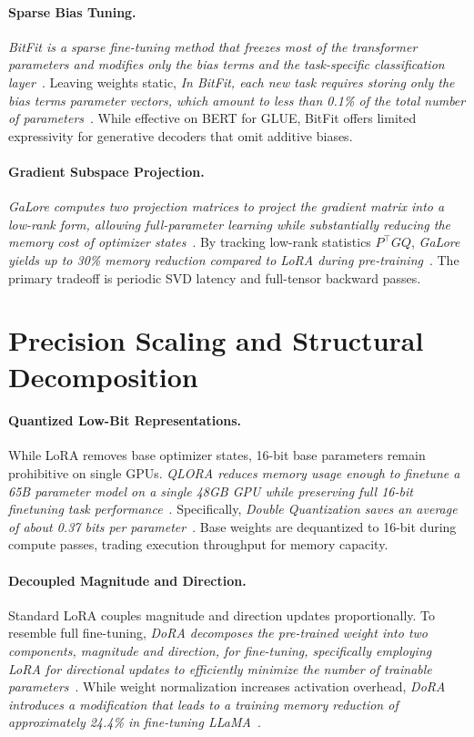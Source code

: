\documentclass[11pt,a4paper]{article}
\begin{document}
\paragraph{Sparse Bias Tuning.}
\textit{BitFit is a sparse fine-tuning method that freezes most of the transformer parameters and modifies only the bias terms and the task-specific classification layer}~\cite{zaken2022bitfit}. Leaving weights static, \textit{In BitFit, each new task requires storing only the bias terms parameter vectors, which amount to less than 0.1\% of the total number of parameters}~\cite{zaken2022bitfit}. While effective on BERT for GLUE, BitFit offers limited expressivity for generative decoders that omit additive biases.

\paragraph{Gradient Subspace Projection.}
\textit{GaLore computes two projection matrices to project the gradient matrix into a low-rank form, allowing full-parameter learning while substantially reducing the memory cost of optimizer states}~\cite{zhao2024galore}. By tracking low-rank statistics $P^\top G Q$, \textit{GaLore yields up to 30\% memory reduction compared to LoRA during pre-training}~\cite{zhao2024galore}. The primary tradeoff is periodic SVD latency and full-tensor backward passes.

\section{Precision Scaling and Structural Decomposition}

\paragraph{Quantized Low-Bit Representations.}
While LoRA removes base optimizer states, 16-bit base parameters remain prohibitive on single GPUs. \textit{QLORA reduces memory usage enough to finetune a 65B parameter model on a single 48GB GPU while preserving full 16-bit finetuning task performance}~\cite{dettmers2023qlora}. Specifically, \textit{Double Quantization saves an average of about 0.37 bits per parameter}~\cite{dettmers2023qlora}. Base weights are dequantized to 16-bit during compute passes, trading execution throughput for memory capacity.

\paragraph{Decoupled Magnitude and Direction.}
Standard LoRA couples magnitude and direction updates proportionally. To resemble full fine-tuning, \textit{DoRA decomposes the pre-trained weight into two components, magnitude and direction, for fine-tuning, specifically employing LoRA for directional updates to efficiently minimize the number of trainable parameters}~\cite{liu2024dora}. While weight normalization increases activation overhead, \textit{DoRA introduces a modification that leads to a training memory reduction of approximately 24.4\% in fine-tuning LLaMA}~\cite{liu2024dora}.
\end{document}
